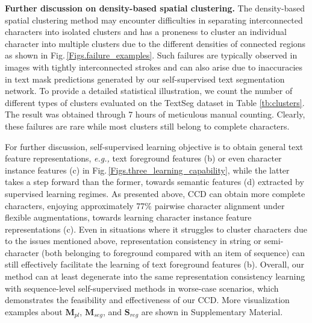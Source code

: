 \documentclass[10pt,twocolumn,letterpaper]{article}
\begin{document}
\begin{table}[t]
  \centering
  \caption{}
  \label{tb:clusters}
  \end{table}
  
\noindent \textbf{Further discussion on density-based spatial clustering.}
The density-based spatial clustering method may encounter difficulties in separating interconnected characters into isolated clusters and has a proneness to cluster an individual character into multiple clusters due to the different densities of connected regions as shown in Fig.\,\ref{Figs.failure_examples}. Such failures are typically observed in images with tightly interconnected strokes and can also arise due to inaccuracies in text mask predictions generated by our self-supervised text segmentation network. To provide a detailed statistical illustration, we count the number of different types of clusters evaluated on the TextSeg dataset in Table \ref{tb:clusters}. The result was obtained through 7 hours of meticulous manual counting. Clearly, these failures are rare while most clusters still belong to complete characters.

For further discussion, self-supervised learning objective is to obtain general text feature representations, \emph{e.g.,} text foreground features (b) or even character instance features (c) in Fig.\,\ref{Figs.three_learning_capability}, while the latter takes a step forward than the former, towards semantic features (d) extracted by supervised learning regimes. 
As presented above, CCD can obtain more complete characters, enjoying approximately 77\% pairwise character alignment under flexible augmentations, towards learning character instance feature representations (c). 
Even in situations where it struggles to cluster characters due to the issues mentioned above, representation consistency in string or semi-character (both belonging to foreground compared with an item of sequence) can still effectively facilitate the learning of text foreground features (b). 
Overall, our method can at least degenerate into the same representation consistency learning with sequence-level self-supervised methods in worse-case scenarios, which demonstrates the feasibility and effectiveness of our CCD. 
More visualization examples about $\mathbf{M}_{pl}$, $\mathbf{M}_{seg}$, and $\mathbf{S}_{reg}$ are shown in Supplementary Material.
\end{document}
